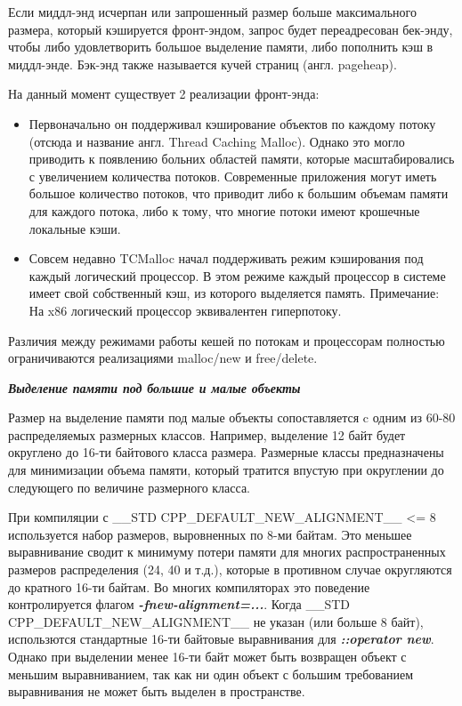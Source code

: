 Если миддл-энд исчерпан или запрошенный размер больше максимального размера, который кэшируется фронт-эндом, запрос будет переадресован бек-энду, чтобы либо удовлетворить большое выделение памяти, либо пополнить кэш в миддл-энде. Бэк-энд также называется кучей страниц (англ. pageheap).

На данный момент существует 2 реализации фронт-энда:
\begin{itemize}
	\item Первоначально он поддерживал кэширование объектов по каждому потоку (отсюда и название англ. Thread Caching Malloc). Однако это могло приводить к появлению больних областей памяти, которые масштабировались с увеличением количества потоков. Современные приложения могут иметь большое количество потоков, что приводит либо к большим объемам памяти для каждого потока, либо к тому, что многие потоки имеют крошечные локальные кэши.
	\item Совсем недавно TCMalloc начал поддерживать режим кэширования под каждый логический процессор. В этом режиме каждый процессор в системе имеет свой собственный кэш, из которого выделяется память. Примечание: На x86 логический процессор эквивалентен гиперпотоку.
\end{itemize}

Различия между режимами работы кешей по потокам и процессорам полностью ограничиваются реализациями malloc/new и free/delete.

\textit{\textbf{Выделение памяти под большие и малые объекты}}

Размер на выделение памяти под малые объекты сопоставляется c одним из 60-80 распределяемых размерных классов. Например, выделение 12 байт будет округлено до 16-ти байтового класса размера. Размерные классы предназначены для минимизации объема памяти, который тратится впустую при округлении до следующего по величине размерного класса.

При компиляции с  \_\_STD CPP\_DEFAULT\_NEW\_ALIGNMENT\_\_ <= 8 используется набор размеров, выровненных по 8-ми байтам. Это меньшее выравнивание сводит к минимуму потери памяти для многих распространенных размеров распределения (24, 40 и т.д.), которые в противном случае округляются до кратного 16-ти байтам. Во многих компиляторах это поведение контролируется флагом \textbf{\textit{-fnew-alignment=...}}. Когда \_\_STD CPP\_DEFAULT\_NEW\_ALIGNMENT\_\_ не указан (или больше 8 байт), использются стандартные 16-ти байтовые выравнивания для \textit{\textbf{::operator new}}. Однако при выделении менее 16-ти байт может быть возвращен объект с меньшим выравниванием, так как ни один объект с большим требованием выравнивания не может быть выделен в пространстве.

